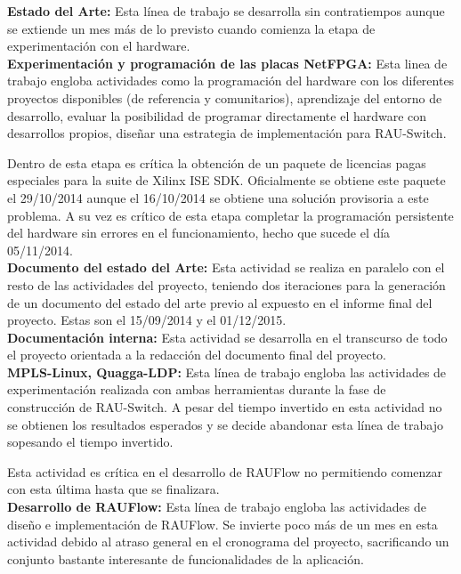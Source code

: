 \textbf{Estado del Arte:} Esta l\'inea de trabajo se desarrolla sin contratiempos aunque se extiende un mes m\'as de lo previsto cuando comienza la etapa de experimentaci\'on con el hardware.\\
  
\textbf{Experimentaci\'on y programaci\'on de las placas NetFPGA:} Esta linea de trabajo engloba actividades como la programaci\'on del hardware con los diferentes proyectos disponibles (de referencia y comunitarios), aprendizaje del entorno de desarrollo, evaluar la posibilidad de programar directamente el hardware con desarrollos propios, diseñar una estrategia de implementaci\'on para RAU-Switch.

Dentro de esta etapa es cr\'itica la obtenci\'on de un paquete de licencias pagas especiales para la suite de Xilinx ISE SDK. Oficialmente se obtiene este paquete el 29/10/2014 aunque el 16/10/2014 se obtiene una soluci\'on provisoria a este problema. A su vez es cr\'itico de esta etapa completar la programaci\'on persistente del hardware sin errores en el funcionamiento, hecho que sucede el día 05/11/2014.\\

\textbf{Documento del estado del Arte:} Esta actividad se realiza en paralelo con el resto de las actividades del proyecto, teniendo dos iteraciones para la generación de un documento del estado del arte previo al expuesto en el informe final del proyecto. Estas son el 15/09/2014 y el 01/12/2015.\\

\textbf{Documentación interna:} Esta actividad se desarrolla en el transcurso de todo el proyecto orientada a la redacci\'on del documento final del proyecto.\\

\textbf{MPLS-Linux, Quagga-LDP:} Esta l\'inea de trabajo engloba las actividades de experimentaci\'on realizada con ambas herramientas durante la fase de construcci\'on de RAU-Switch. A pesar del tiempo invertido en esta actividad no se obtienen los resultados esperados y se decide abandonar esta l\'inea de trabajo sopesando el tiempo invertido.

Esta actividad es cr\'itica en el desarrollo de RAUFlow no permitiendo comenzar con esta \'ultima hasta que se finalizara.\\

\textbf{Desarrollo de RAUFlow:} Esta l\'inea de trabajo engloba las actividades de diseño e implementaci\'on de RAUFlow. Se invierte poco m\'as de un mes en esta actividad debido al atraso general en el cronograma del proyecto, sacrificando un conjunto bastante interesante de funcionalidades de la aplicaci\'on.\\

